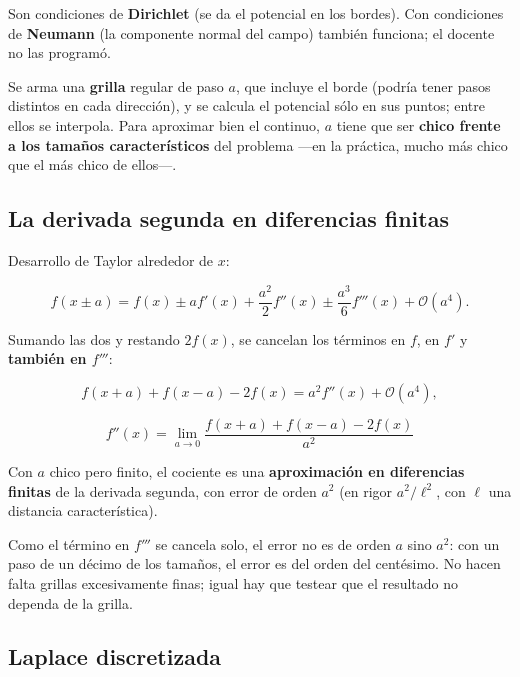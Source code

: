 \documentclass[12pt,a4paper]{article}
\begin{document}
\begin{notebox}
Son condiciones de \textbf{Dirichlet} (se da el potencial en los bordes). Con
condiciones de \textbf{Neumann} (la componente normal del campo) también funciona;
el docente no las programó.
\end{notebox}

Se arma una \textbf{grilla} regular de paso $a$, que incluye el borde (podría tener
pasos distintos en cada dirección), y se calcula el potencial sólo en sus
puntos; entre ellos se interpola. Para aproximar bien el continuo, $a$ tiene
que ser \textbf{chico frente a los tamaños característicos} del problema ---en la
práctica, mucho más chico que el más chico de ellos---.

\subsection{La derivada segunda en diferencias finitas}

Desarrollo de Taylor alrededor de $x$:

\[
f(x\pm a) = f(x) \pm a f'(x) + \frac{a^2}{2}f''(x) \pm \frac{a^3}{6}f'''(x) + \mathcal O(a^4).
\]

Sumando las dos y restando $2f(x)$, se cancelan los términos en $f$, en $f'$ y
\textbf{también en $f'''$}:

\[
f(x+a) + f(x-a) - 2f(x) = a^2 f''(x) + \mathcal O(a^4),
\]

\begin{keybox}
\[
\boxed{\ f''(x) = \lim_{a\to0}\frac{f(x+a)+f(x-a)-2f(x)}{a^2}\ }
\]
\end{keybox}

Con $a$ chico pero finito, el cociente es una \textbf{aproximación en diferencias
finitas} de la derivada segunda, con error de orden $a^2$ (en rigor
$a^2/\ell^2$, con $\ell$ una distancia característica).

\begin{notebox}
Como el término en $f'''$ se cancela
solo, el error no es de orden $a$ sino $a^2$: con un paso de un décimo de los
tamaños, el error es del orden del centésimo. No hacen falta grillas
excesivamente finas; igual hay que testear que el resultado no dependa de la
grilla.
\end{notebox}

\subsection{Laplace discretizada}
\end{document}

